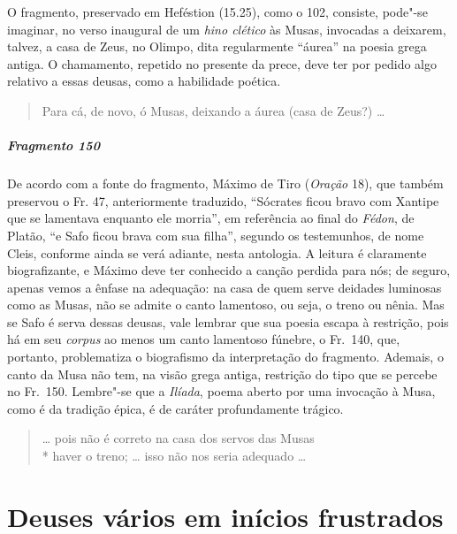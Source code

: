 {\small O fragmento, preservado em Heféstion (15.25), como o 102, consiste, pode"-se imaginar, no
verso inaugural de um \textit{hino clético }às Musas, invocadas a deixarem,
talvez, a casa de Zeus, no Olimpo, dita regularmente ``áurea''
na poesia grega antiga. O chamamento, repetido no presente da prece, deve ter
por pedido algo relativo a essas deusas, como a habilidade poética.}

\begin{verse}
Para cá, de novo, ó Musas, deixando a áurea (casa de Zeus?) \ldots{}
\end{verse}

\paragraph{Fragmento 150}

{\small De acordo com a fonte do fragmento, Máximo de Tiro (\textit{Oração} 18), que também preservou o Fr.
47, anteriormente traduzido, ``Sócrates ficou bravo com Xantipe que se
lamentava enquanto ele morria”, em referência ao final do \textit{Fédon}, de
Platão, ``e Safo ficou brava com sua filha”, segundo os testemunhos, de
nome Cleis, conforme ainda se verá adiante, nesta antologia. A leitura é
claramente biografizante, e Máximo deve ter conhecido a canção perdida para
nós; de seguro, apenas vemos a ênfase na adequação: na casa de quem serve
deidades luminosas como as Musas, não se admite o canto lamentoso, ou seja, o
treno ou nênia. Mas se Safo é serva dessas deusas, vale lembrar que sua poesia
escapa à restrição, pois há em seu \textit{corpus} ao menos um canto lamentoso
fúnebre, o Fr.~140, que, portanto, problematiza o biografismo da interpretação
do fragmento. Ademais, o canto da Musa não tem, na visão grega antiga,
restrição do tipo que se percebe no Fr.~150. Lembre"-se que a \textit{Ilíada},
poema aberto por uma invocação à Musa, como é da tradição épica, é de caráter
profundamente trágico.}

\begin{verse}
\ldots{} pois não é correto na casa dos servos das Musas\\*
haver o treno; \ldots{} isso não nos seria adequado \ldots{}
\end{verse}

\chapter{Deuses vários em inícios frustrados}


